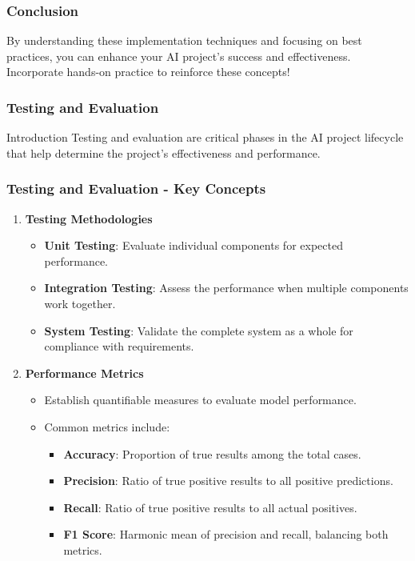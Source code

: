 \documentclass[aspectratio=169]{beamer}
\begin{document}
\begin{frame}
    \frametitle{Conclusion}
    By understanding these implementation techniques and focusing on best practices, you can enhance your AI project’s success and effectiveness. Incorporate hands-on practice to reinforce these concepts!
\end{frame}

\begin{frame}[fragile]
    \frametitle{Testing and Evaluation}
    \begin{block}{Introduction}
        Testing and evaluation are critical phases in the AI project lifecycle that help determine the project’s effectiveness and performance.
    \end{block}
\end{frame}

\begin{frame}[fragile]
    \frametitle{Testing and Evaluation - Key Concepts}
    \begin{enumerate}
        \item \textbf{Testing Methodologies}
        \begin{itemize}
            \item \textbf{Unit Testing}: Evaluate individual components for expected performance.
            \item \textbf{Integration Testing}: Assess the performance when multiple components work together.
            \item \textbf{System Testing}: Validate the complete system as a whole for compliance with requirements.
        \end{itemize}
        
        \item \textbf{Performance Metrics}
        \begin{itemize}
            \item Establish quantifiable measures to evaluate model performance.
            \item Common metrics include:
            \begin{itemize}
                \item \textbf{Accuracy}: Proportion of true results among the total cases.
                \item \textbf{Precision}: Ratio of true positive results to all positive predictions.
                \item \textbf{Recall}: Ratio of true positive results to all actual positives.
                \item \textbf{F1 Score}: Harmonic mean of precision and recall, balancing both metrics.
            \end{itemize}
        \end{itemize}
    \end{enumerate}
\end{frame}
\end{document}
